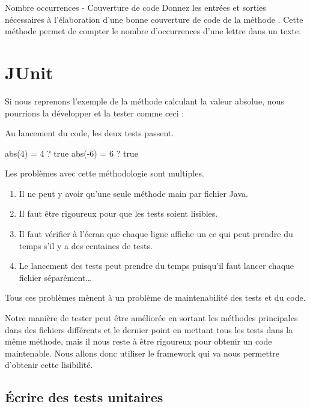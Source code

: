 \documentclass[a4paper,11pt]{style-esi/td}
\begin{document}
\begin{Exercice}{Nombre occurrences - Couverture de code}
	Donnez les entrées et sorties nécessaires 
	à l’élaboration d’une bonne couverture de code 
	de la méthode . 
	Cette méthode permet de compter le nombre d'occurrences d’une lettre dans un texte.
\end{Exercice}

\section{JUnit}

Si nous reprenons l’exemple de la méthode calculant la valeur absolue, nous pourrions la développer et la tester comme ceci :

Au lancement du code, les deux tests passent.
\begin{Console}
	abs(4) = 4 ? true
	abs(-6) = 6 ? true
\end{Console}

Les problèmes avec cette méthodologie sont multiples.
\begin{enumerate}
	\item Il ne peut y avoir qu’une seule méthode main par fichier Java.
	\item Il faut être rigoureux pour que les tests soient lisibles.
	\item Il faut vérifier à l'écran que chaque ligne affiche un 
	      ce qui peut prendre du temps s'il y a des centaines de tests.
	\item Le lancement des tests peut prendre du temps
	      puisqu'il faut lancer chaque fichier séparément\dots
\end{enumerate}

Tous ces problèmes mènent à un problème de maintenabilité des tests et du code.

Notre manière de tester peut être améliorée
en sortant les méthodes principales dans des fichiers différents
et le dernier point en mettant tous les tests dans la même méthode,
mais il nous reste à être rigoureux pour obtenir un code maintenable.
Nous allons donc utiliser le framework 
qui va nous permettre d'obtenir cette lisibilité.

\subsection{Écrire des tests unitaires}
\end{document}
